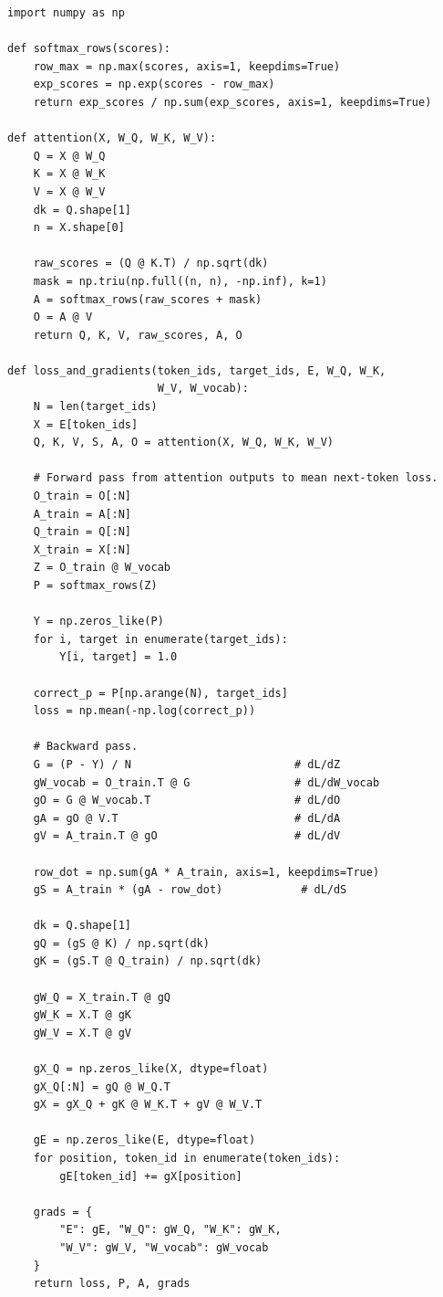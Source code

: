 \documentclass[11pt]{article}
\begin{document}
\begin{lstlisting}
import numpy as np

def softmax_rows(scores):
    row_max = np.max(scores, axis=1, keepdims=True)
    exp_scores = np.exp(scores - row_max)
    return exp_scores / np.sum(exp_scores, axis=1, keepdims=True)

def attention(X, W_Q, W_K, W_V):
    Q = X @ W_Q
    K = X @ W_K
    V = X @ W_V
    dk = Q.shape[1]
    n = X.shape[0]

    raw_scores = (Q @ K.T) / np.sqrt(dk)
    mask = np.triu(np.full((n, n), -np.inf), k=1)
    A = softmax_rows(raw_scores + mask)
    O = A @ V
    return Q, K, V, raw_scores, A, O

def loss_and_gradients(token_ids, target_ids, E, W_Q, W_K,
                       W_V, W_vocab):
    N = len(target_ids)
    X = E[token_ids]
    Q, K, V, S, A, O = attention(X, W_Q, W_K, W_V)

    # Forward pass from attention outputs to mean next-token loss.
    O_train = O[:N]
    A_train = A[:N]
    Q_train = Q[:N]
    X_train = X[:N]
    Z = O_train @ W_vocab
    P = softmax_rows(Z)

    Y = np.zeros_like(P)
    for i, target in enumerate(target_ids):
        Y[i, target] = 1.0

    correct_p = P[np.arange(N), target_ids]
    loss = np.mean(-np.log(correct_p))

    # Backward pass.
    G = (P - Y) / N                         # dL/dZ
    gW_vocab = O_train.T @ G                # dL/dW_vocab
    gO = G @ W_vocab.T                      # dL/dO
    gA = gO @ V.T                           # dL/dA
    gV = A_train.T @ gO                     # dL/dV

    row_dot = np.sum(gA * A_train, axis=1, keepdims=True)
    gS = A_train * (gA - row_dot)            # dL/dS

    dk = Q.shape[1]
    gQ = (gS @ K) / np.sqrt(dk)
    gK = (gS.T @ Q_train) / np.sqrt(dk)

    gW_Q = X_train.T @ gQ
    gW_K = X.T @ gK
    gW_V = X.T @ gV

    gX_Q = np.zeros_like(X, dtype=float)
    gX_Q[:N] = gQ @ W_Q.T
    gX = gX_Q + gK @ W_K.T + gV @ W_V.T

    gE = np.zeros_like(E, dtype=float)
    for position, token_id in enumerate(token_ids):
        gE[token_id] += gX[position]

    grads = {
        "E": gE, "W_Q": gW_Q, "W_K": gW_K,
        "W_V": gW_V, "W_vocab": gW_vocab
    }
    return loss, P, A, grads


\end{lstlisting}
\end{document}
